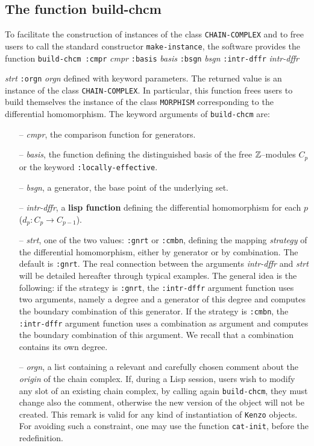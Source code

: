 \subsection {The function build-chcm}

To facilitate the construction of instances of the class {\tt CHAIN-COMPLEX} and to free users to call
the standard constructor {\tt make-instance}, the software provides the function
\vskip 0.35cm
{\tt build-chcm :cmpr} {\em cmpr} {\tt :basis} {\em basis} {\tt :bsgn} {\em bsgn} {\tt :intr-dffr} {\em intr-dffr} \par
\hspace*{22.5mm}{\tt :strt} {\em strt} {\tt :orgn} {\em orgn}
\vskip 0.35cm
defined with keyword parameters. The returned value is an instance of the class {\tt CHAIN-COMPLEX}.
In particular, this function frees users to build themselves
the   instance of the class {\tt MORPHISM} corresponding to the differential homomorphism.
The keyword arguments of {\tt build-chcm} are:
\begin{itemize}
\item [--] {\em cmpr}, the comparison function for generators.
\item [--] {\em basis}, the function defining the distinguished  basis of the free
${\mathbb{Z}}$--modules $C_p$ or the keyword {\tt :locally-effective}.
\item [--] {\em bsgn}, a generator, the base point of the underlying set.
\item [--] {\em intr-dffr}, a {\bf lisp function} defining the differential homomorphism for each $p$
($d_p : C_p \rightarrow C_{p-1}$).
\item [--] {\em strt}, one of the two values: {\tt :gnrt} or {\tt :cmbn}, defining the
mapping {\em strategy} of the differential homomorphism, either by generator or by combination.
The default is {\tt :gnrt}. The real connection between the  arguments {\em intr-dffr} and {\em strt}
will be detailed hereafter through typical examples. The general idea is the following: if the
strategy is  {\tt :gnrt}, the {\tt :intr-dffr} argument function  uses two arguments, namely
a degree and a generator of this degree and computes the boundary combination of this generator.
If the strategy is  {\tt :cmbn}, the {\tt :intr-dffr} argument function uses a combination as argument
and computes the boundary combination of this argument. We recall that a combination contains
its own degree.
\item [--] {\em orgn}, a list containing  a relevant and carefully chosen  comment
about the {\em origin} of the chain complex. If, during a Lisp session, users wish to  modify any slot
of an existing chain complex, by calling again {\tt build-chcm},
they must change also the comment, otherwise the new version of the object will not be created. This
remark is valid for any kind of instantiation of {\tt Kenzo} objects.
For avoiding such a constraint, one may use  the function {\tt cat-init}, before the redefinition.

\end{itemize}

